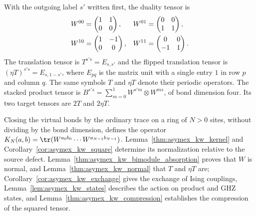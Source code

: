\begin{definition}
    \label{def:asymex_kw}
    \leanok
    With the outgoing label $s'$ written first, the duality tensor is
    \begin{align}
        W^{00} & =\begin{pmatrix}1&1\\0&0\end{pmatrix},
               &
        W^{01} & =\begin{pmatrix}0&0\\1&1\end{pmatrix},
        \notag                                           \\
        W^{10} & =\begin{pmatrix}1&-1\\0&0\end{pmatrix},
               &
        W^{11} & =\begin{pmatrix}0&0\\-1&1\end{pmatrix}.
        \notag
    \end{align}
    The translation tensor is $T^{s's}=E_{s,s'}$ and the flipped
    translation tensor is $(\eta T)^{s's}=E_{s,1-s'}$, where $E_{pq}$ is
    the matrix unit with a single entry $1$ in row $p$ and column $q$.
    The same symbols $T$ and $\eta T$ denote their periodic operators.
    The stacked product tensor is
    $B^{s's}=\sum_{m=0}^1W^{s'm}\otimes W^{ms}$, of bond dimension four.
    Its two target tensors are $2T$ and $2\eta T$.
\end{definition}

Closing the virtual bonds by the ordinary trace on a ring of $N>0$ sites,
without dividing by the bond dimension, defines the operator
$K_N(a,b)=\tr(W^{a_0b_0}\cdots W^{a_{N-1}b_{N-1}})$.
Lemma~\ref{thm:asymex_kw_kernel} and Corollary~\ref{cor:asymex_kw_square}
determine its normalization relative to the source defect.
Lemma~\ref{thm:asymex_kw_bimodule_absorption} proves that $W$ is normal,
and Lemma~\ref{thm:asymex_kw_normal} that $T$ and $\eta T$ are;
Corollary~\ref{cor:asymex_kw_exchange} gives the exchange of Ising couplings,
Lemma~\ref{lem:asymex_kw_states} describes the action on product and
GHZ states, and Lemma~\ref{thm:asymex_kw_compression} establishes the
compression of the squared tensor.

